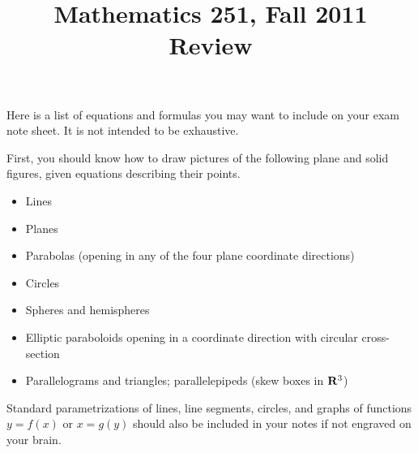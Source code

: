 \documentclass[12pt]{amsart}
\title{Mathematics 251, Fall 2011 \\ Review}
\begin{document}
\maketitle
\thispagestyle{empty}

Here is a list of equations and formulas you may want to include on your exam note sheet. It is not intended to be exhaustive.

First, you should know how to draw pictures of the following plane and solid figures, given equations describing their points.

\begin{itemize}
    \item Lines
    \item Planes
    \item Parabolas (opening in any of the four plane coordinate directions)
    \item Circles
    \item Spheres and hemispheres
    \item Elliptic paraboloids opening in a coordinate direction with circular cross-section
    \item Parallelograms and triangles; parallelepipeds (skew boxes in $\mathbf R^3$)
\end{itemize}

Standard parametrizations of lines, line segments, circles, and graphs of functions $y = f(x)$ or $x = g(y)$ should also be included in your notes if not engraved on your brain.
\end{document}
